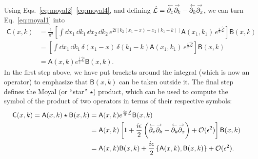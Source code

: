 %
Using Eqs.~\eqref{eq:moyal2}--\eqref{eq:moyal4}, and defining $\hat{\mathcal{L}} = \overset{\gets}{\partial_{x}} \overset{\to}{\partial_{k}} - \overset{\gets}{\partial_{k}}\overset{\to}{\partial_{x}}$, we can turn Eq.~\eqref{eq:moyal1} into
%
\begin{equation}
  \begin{aligned}
    \mathsf{C}(x, k) &= \frac{1}{\pi^{2}} \left[\int \dd{x_{1}}\, \dd{k_{1}}\, \dd{x_{2}}\, \dd{k_{2}}\,e^{2i[k_{2}(x_{1} - x) - x_{2}(k_{1} - k)]} \mathsf{A}(x_{1}, k_{1})\, e^{\frac{i}{2}\hat{\mathcal{L}}}\right] \mathsf{B}(x, k)\\
                     &= \left[\int \dd{x_{1}}\, \dd{k_{1}}\, \delta(x_{1} - x)\,\delta(k_{1} - k) \mathsf{A}(x_{1}, k_{1})\, e^{\frac{i}{2}\hat{\mathcal{L}}}\right] \mathsf{B}(x, k)\\
                     &= \mathsf{A}(x, k)e^{\frac{i}{2}\hat{\mathcal{L}}} \mathsf{B}(x, k).
  \end{aligned}
\end{equation}
%
In the first step above, we have put brackets around the integral (which is now an operator) to emphasize that $\mathsf{B}(x, k)$ can be taken outside it.
The final step defines the Moyal (or ``star'' $\star$) product, which can be used to compute the symbol of the product of two operators in terms of their respective symbols:
%
\begin{equation}
  \begin{aligned}
    \mathsf{C}(x, k) = \mathsf{A}(x, k)\star\mathsf{B}(x, k) &= \mathsf{A}(x, k)e^{\frac{i\epsilon}{2}\hat{\mathcal{L}}} \mathsf{B}(x, k)\\
                                                             &= \mathsf{A}(x, k)\left[1 + \frac{i\epsilon}{2}\left(\overset{\gets}{\partial_{x}}\overset{\to}{\partial_{k}} - \overset{\gets}{\partial_{k}}\overset{\to}{\partial_{x}}\right) + \mathcal{O}(\epsilon^{2}) \right] \mathsf{B}(x, k)\\
                                                             &= \mathsf{A}(x, k)\mathsf{B}(x, k) + \frac{i\epsilon}{2}\left\{\mathsf{A}(x, k), \mathsf{B}(x, k)\right\} + \mathcal{O}(\epsilon^{2}).
  \end{aligned}
\end{equation}
